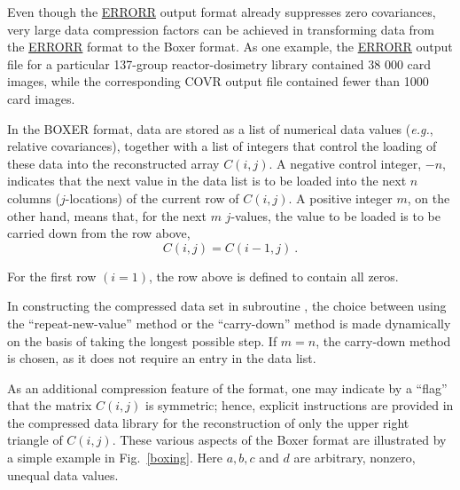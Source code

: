 Even though the
\hyperlink{sERRORRhy}{ERRORR} output format already suppresses zero
covariances, very large data compression factors can be achieved in
transforming data from the
\hyperlink{sERRORRhy}{ERRORR} format to the Boxer format.  As one
example, the
\hyperlink{sERRORRhy}{ERRORR} output file for a particular 137-group
reactor-dosimetry library\cite{multigroup} contained 38 000 card
images, while the corresponding COVR output file contained fewer than
1000 card images.

In the BOXER format, data are stored as a list of numerical data values
({\it e.g.}, relative covariances), together with a list of integers
that control the loading of these data into the reconstructed array
$C(i,j)$.  A negative control integer, $-n$, indicates that the next
value in the data list is to be loaded into the next $n$ columns
($j$-locations) of the current row of $C(i,j)$.  A positive integer
$m$, on the other hand, means that, for the next $m$ $j$-values, the
value to be loaded is to be carried down from the row above,
\begin{equation}
C(i,j) = C(i{-}1,j)\:.
\end{equation}

\noindent
For the first row $(i = 1)$, the row above is defined to contain all zeros.

In constructing the compressed data set in subroutine ,
the choice between using the ``repeat-new-value'' method or
the ``carry-down'' method is made dynamically on the basis of taking
the longest possible step.  If $m = n$, the carry-down method is
chosen, as it does not require an entry in the data list.

As an additional compression feature of the format, one may indicate by
a ``flag'' that the matrix $C(i,j)$ is symmetric; hence, explicit
instructions are provided in the compressed data library for the
reconstruction  of only the upper right triangle of $C(i,j)$.  These
various aspects of the Boxer format are illustrated by a simple example
in Fig.~\ref{boxing}.  Here $a,b,c$ and $d$ are arbitrary, nonzero,
unequal data values.

